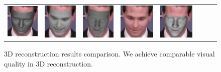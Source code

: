 \begin{figure}[t!]
\begin{center}
\begin{tabular}{c@{\hskip 1.5mm}c@{\hskip 1mm}c@{\hskip 1.5mm}c@{\hskip 1mm}c@{\hskip 1.5mm}c@{\hskip 1mm}c@{\hskip 1mm}c@{}}
\includegraphics[width=\FittingFigWid]{img/Random/300VW_7_shape.png} &
\includegraphics[width=\FittingFigWid]{img/Random/300VW_7_Richardson_rescon.png} &
\includegraphics[width=\FittingFigWid]{img/Random/300VW_7_Richardson_shape.png} &
\includegraphics[width=\FittingFigWid]{img/Random/300VW_7_Tewari_rescon.png} &
\includegraphics[width=\FittingFigWid]{img/Random/300VW_7_Tewari_shape.png} &
\\
\end{tabular}
\vspace{-2mm}
\caption{\small 3D reconstruction results comparison. We achieve comparable visual quality in 3D reconstruction.}
\label{fig:3drecon_exp}\figvspace \vspace{-2mm}
\end{center}
\end{figure}

